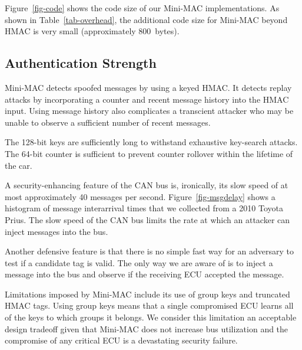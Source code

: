 Figure~\ref{fig-code} shows the code size of our Mini-MAC implementations.
As shown in Table~\ref{tab-overhead}, the additional code size for Mini-MAC beyond
HMAC is very small (approximately 800~bytes).





	
\subsection{Authentication Strength}
\label{security}

Mini-MAC detects spoofed messages by using a keyed HMAC.  It detects replay attacks
by incorporating a counter and recent message history into the HMAC input.  Using message
history also complicates a transcient attacker who may be unable to observe a sufficient
number of recent messages.  

The 128-bit keys are sufficiently long to withstand 
exhaustive key-search attacks.  The 64-bit counter is sufficient to prevent counter
rollover within the lifetime of the car.


A security-enhancing feature of the CAN bus is, ironically, its slow speed of at most
approximately 40 messages per second.  Figure~\ref{fig-msgdelay} shows a histogram of
message interarrival times that we collected from a 2010 Toyota Prius.
The slow speed of the CAN bus limits the rate at which an attacker can
inject messages into the bus.

Another defensive feature is that there is no simple fast way for an adversary to
test if a candidate tag is valid.   The only way we are aware of is to inject a message into the bus
and observe if the receiving ECU accepted the message.

Limitations imposed by Mini-MAC include its use of group keys and truncated HMAC tags.  
Using group keys means that a single compromised ECU learns all of the keys
to which groups it belongs.  We consider this limitation an acceptable design tradeoff
given that Mini-MAC does not increase bus utilization and the compromise of any critical
ECU is a devastating security failure.

